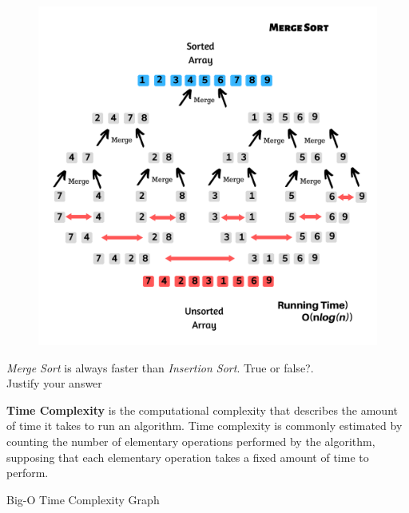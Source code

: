 \documentclass[11pt,fleqn]{book}
\begin{document}
\begin{figure}[H]
    \centering
    \includegraphics[width=150mm]{Pictures/1.pdf}
\end{figure}
\begin{example}
 \textit{Merge Sort} is always faster than \textit{Insertion Sort}.  True or false?. \\ Justify your answer
\end{example}
\begin{definition}
\textbf{Time Complexity} is the computational complexity that describes the amount of time it takes to run an algorithm. Time complexity is commonly estimated by counting the number of elementary operations performed by the algorithm, supposing that each elementary operation takes a fixed amount of time to perform.
\end{definition}
\begin{center}
Big-O Time Complexity Graph
\end{center}
\end{document}
